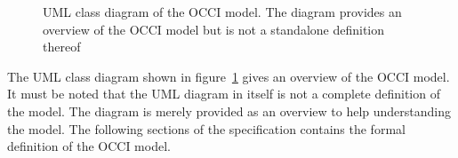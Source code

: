 \documentclass[10pt,a4paper,british]{article}
\begin{document}
\begin{figure}[!h]
{\centering {} \par}
\caption{UML class diagram of the OCCI model. The diagram provides an
overview of the OCCI model but is not a standalone definition thereof}
\label{fig:occi_model}
\end{figure}

The UML class diagram shown in figure~\ref{fig:occi_model} gives an overview of
the OCCI model. It must be noted that the UML diagram in itself is not a
complete definition of the model. The diagram is merely provided as an overview
to help understanding the model.  The following sections of the specification
contains the formal definition of the OCCI model.
\end{document}
